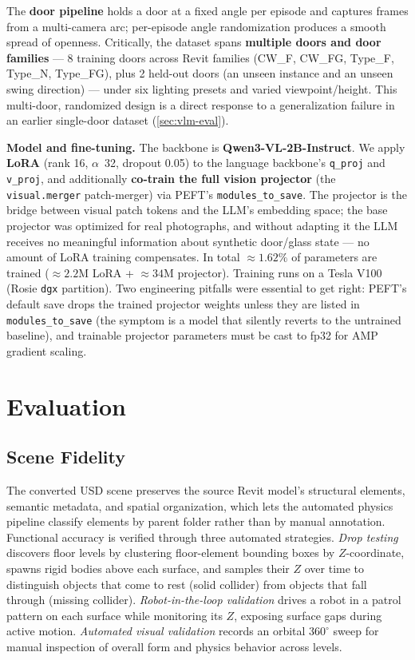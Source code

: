 \documentclass[10pt,twocolumn,letterpaper]{article}
\begin{document}
The \textbf{door pipeline} holds a door at a fixed angle per episode and captures
frames from a multi-camera arc; per-episode angle randomization produces a smooth
spread of openness. Critically, the dataset spans \textbf{multiple doors and door
families} --- 8 training doors across Revit families (CW\_F, CW\_FG, Type\_F,
Type\_N, Type\_FG), plus 2 held-out doors (an unseen instance and an unseen swing
direction) --- under six lighting presets and varied viewpoint/height. This
multi-door, randomized design is a direct response to a generalization failure in
an earlier single-door dataset (\cref{sec:vlm-eval}).

\noindent\textbf{Model and fine-tuning.}
The backbone is \textbf{Qwen3-VL-2B-Instruct}. We apply \textbf{LoRA} (rank 16,
$\alpha$~32, dropout 0.05) to the language backbone's \texttt{q\_proj} and
\texttt{v\_proj}, and additionally \textbf{co-train the full vision projector}
(the \texttt{visual.merger} patch-merger) via PEFT's \texttt{modules\_to\_save}.
The projector is the bridge between visual patch tokens and the LLM's embedding
space; the base projector was optimized for real photographs, and without adapting
it the LLM receives no meaningful information about synthetic door/glass state ---
no amount of LoRA training compensates. In total $\approx\mathbf{1.62\%}$ of
parameters are trained ($\approx2.2$M LoRA + $\approx34$M projector). Training runs
on a Tesla V100 (Rosie \texttt{dgx} partition). Two engineering pitfalls were
essential to get right: PEFT's default save drops the trained projector weights
unless they are listed in \texttt{modules\_to\_save} (the symptom is a model that
silently reverts to the untrained baseline), and trainable projector parameters
must be cast to fp32 for AMP gradient scaling.

\section{Evaluation}
\label{sec:eval}

\subsection{Scene Fidelity}

The converted USD scene preserves the source Revit model's structural elements,
semantic metadata, and spatial organization, which lets the automated physics
pipeline classify elements by parent folder rather than by manual annotation.
Functional accuracy is verified through three automated strategies. \emph{Drop
testing} discovers floor levels by clustering floor-element bounding boxes by
$Z$-coordinate, spawns rigid bodies above each surface, and samples their $Z$ over
time to distinguish objects that come to rest (solid collider) from objects that
fall through (missing collider). \emph{Robot-in-the-loop validation} drives a robot
in a patrol pattern on each surface while monitoring its $Z$, exposing surface
gaps during active motion. \emph{Automated visual validation} records an orbital
$360^\circ$ sweep for manual inspection of overall form and physics behavior
across levels.
\end{document}
